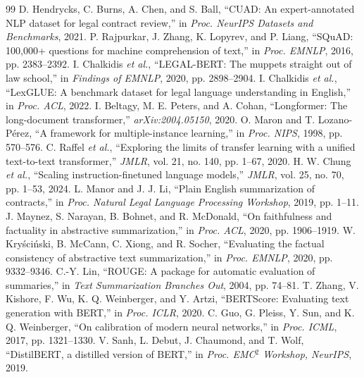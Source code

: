 \documentclass[journal,a4paper]{IEEEtran}
\begin{document}
\begin{thebibliography}{99}
 D. Hendrycks, C. Burns, A. Chen, and S. Ball, ``CUAD: An expert-annotated NLP dataset for legal contract review,'' in \emph{Proc. NeurIPS Datasets and Benchmarks}, 2021.
 P. Rajpurkar, J. Zhang, K. Lopyrev, and P. Liang, ``SQuAD: 100,000+ questions for machine comprehension of text,'' in \emph{Proc. EMNLP}, 2016, pp. 2383--2392.
 I. Chalkidis \emph{et al.}, ``LEGAL-BERT: The muppets straight out of law school,'' in \emph{Findings of EMNLP}, 2020, pp. 2898--2904.
 I. Chalkidis \emph{et al.}, ``LexGLUE: A benchmark dataset for legal language understanding in English,'' in \emph{Proc. ACL}, 2022.
 I. Beltagy, M. E. Peters, and A. Cohan, ``Longformer: The long-document transformer,'' \emph{arXiv:2004.05150}, 2020.
 O. Maron and T. Lozano-P\'erez, ``A framework for multiple-instance learning,'' in \emph{Proc. NIPS}, 1998, pp. 570--576.
 C. Raffel \emph{et al.}, ``Exploring the limits of transfer learning with a unified text-to-text transformer,'' \emph{JMLR}, vol. 21, no. 140, pp. 1--67, 2020.
 H. W. Chung \emph{et al.}, ``Scaling instruction-finetuned language models,'' \emph{JMLR}, vol. 25, no. 70, pp. 1--53, 2024.
 L. Manor and J. J. Li, ``Plain English summarization of contracts,'' in \emph{Proc. Natural Legal Language Processing Workshop}, 2019, pp. 1--11.
 J. Maynez, S. Narayan, B. Bohnet, and R. McDonald, ``On faithfulness and factuality in abstractive summarization,'' in \emph{Proc. ACL}, 2020, pp. 1906--1919.
 W. Kry\'sci\'nski, B. McCann, C. Xiong, and R. Socher, ``Evaluating the factual consistency of abstractive text summarization,'' in \emph{Proc. EMNLP}, 2020, pp. 9332--9346.
 C.-Y. Lin, ``ROUGE: A package for automatic evaluation of summaries,'' in \emph{Text Summarization Branches Out}, 2004, pp. 74--81.
 T. Zhang, V. Kishore, F. Wu, K. Q. Weinberger, and Y. Artzi, ``BERTScore: Evaluating text generation with BERT,'' in \emph{Proc. ICLR}, 2020.
 C. Guo, G. Pleiss, Y. Sun, and K. Q. Weinberger, ``On calibration of modern neural networks,'' in \emph{Proc. ICML}, 2017, pp. 1321--1330.
 V. Sanh, L. Debut, J. Chaumond, and T. Wolf, ``DistilBERT, a distilled version of BERT,'' in \emph{Proc. EMC$^2$ Workshop, NeurIPS}, 2019.
\end{thebibliography}
\end{document}
